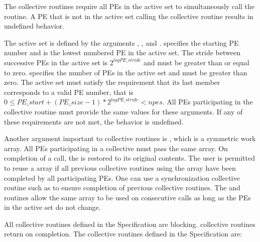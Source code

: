 \begin{DeprecateBlock}
The  collective routines require all \acp{PE}
in the active set to simultaneously call the routine.
A \ac{PE} that is not in the active set calling the collective
routine results in undefined behavior.

The active set is defined by the arguments , ,
and .   specifies the starting \ac{PE} number and
is the lowest numbered PE in the active set.  The stride between successive
\acp{PE} in the active set is $2^{logPE\_stride}$ and  must
be greater than or equal to zero.   specifies the number of
\acp{PE} in the active set and must be greater than zero.  The active set must
satisfy the requirement that its last member corresponds to a valid \ac{PE}
number, that is
$0 \le PE\_start + (PE\_size - 1) * 2^{logPE\_stride} < npes$.
All \acp{PE} participating in the  collective routine must provide the same
values for these arguments.  If any of these requirements are not met, the
behavior is undefined.

Another argument important to  collective routines is , which is a
symmetric work array.  All \acp{PE} participating in a collective must pass the
same  array.  On completion of  a  call, the  is
restored to its original contents.  The user is permitted to reuse a 
array if all previous collective routines using the  array have been
completed by all participating \acp{PE}.  One can use a synchronization
collective routine such as  to ensure completion of previous  collective
routines. The  and  routines allow the same
 array to be used on consecutive calls as long as the \acp{PE}
in the active set do not change.

All  collective routines defined in the Specification are blocking.
  collective routines return on completion.
The  collective routines defined in the \openshmem Specification are:


\end{DeprecateBlock}
